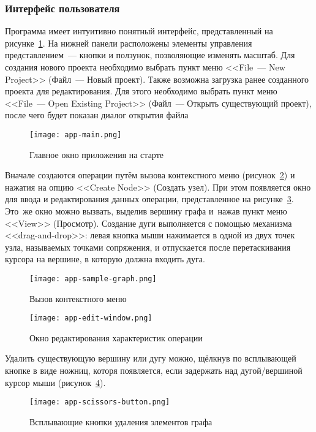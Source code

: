 \subsubsection*{Интерфейс пользователя}
Программа имеет интуитивно понятный интерфейс, представленный на рисунке~\ref{fig:app-main}. На нижней панели расположены элементы управления представлением~--- кнопки и ползунок, позволяющие изменять масштаб. Для создания нового проекта необходимо выбрать пункт меню <<File~--- New Project>> (Файл~--- Новый проект). Также возможна загрузка ранее созданного проекта для редактирования. Для этого необходимо выбрать пункт меню <<File~--- Open Existing Project>> (Файл~--- Открыть существующий проект), после чего будет показан диалог открытия файла 
\begin{figure}[h!]
  \centering
  {
    \texttt{[image: app-main.png]}
  }
  \caption{Главное окно приложения на старте}
  \label{fig:app-main}
\end{figure}

Вначале создаются операции путём вызова контекстного меню (рисунок~\ref{fig:app-sample-graph}) и нажатия на опцию <<Create Node>> (Создать узел). При этом появляется окно для ввода и редактирования данных операции, представленное на рисунке~\ref{fig:app-edit-window}. Это~же окно можно вызвать, выделив вершину графа и~нажав пункт меню <<View>> (Просмотр). Создание дуги выполняется с помощью механизма <<drag-and-drop>>: левая кнопка мыши нажимается в одной из двух точек узла, называемых точками сопряжения, и отпускается после перетаскивания курсора на вершине, в которую должна входить дуга. 

\begin{figure}[b!]
  \centering
  {
    \texttt{[image: app-sample-graph.png]}
  }
  \caption{Вызов контекстного меню}
  \label{fig:app-sample-graph}
\end{figure}

\begin{figure}[h!]
  \centering
  {
    \texttt{[image: app-edit-window.png]}
  }
  \caption{Окно редактирования характеристик операции}
  \label{fig:app-edit-window}
\end{figure}

Удалить существующую вершину или дугу можно, щёлкнув по всплывающей кнопке в виде ножниц, которя появляется, если задержать над дугой/вершиной курсор мыши (рисунок~\ref{fig:app-scissors-button}). 
\begin{figure}[h!]
  \centering
  {
    \texttt{[image: app-scissors-button.png]}
  }
  \caption{Всплывающие кнопки удаления элементов графа}
  \label{fig:app-scissors-button}
\end{figure}

